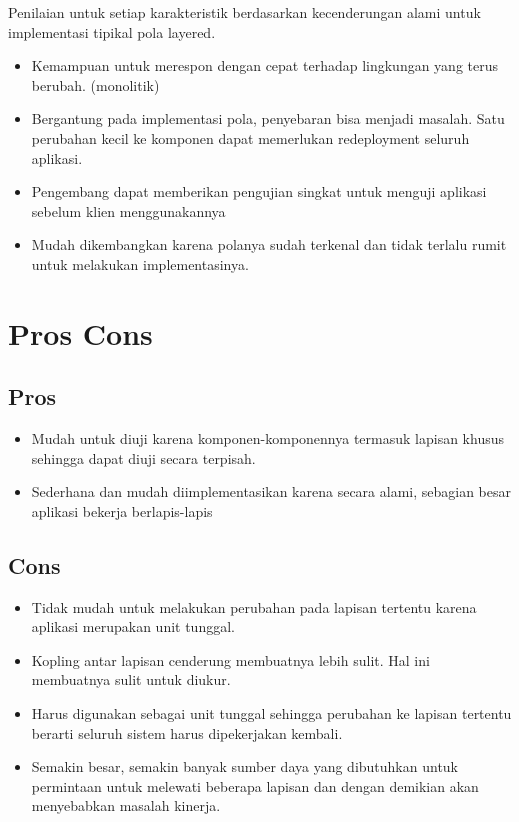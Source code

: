 Penilaian untuk setiap karakteristik berdasarkan kecenderungan alami untuk implementasi tipikal pola layered.

\begin{itemize}
    \item Kemampuan untuk merespon dengan cepat terhadap lingkungan yang terus berubah. (monolitik)
    \item Bergantung pada implementasi pola, penyebaran bisa menjadi masalah. Satu perubahan kecil ke komponen dapat memerlukan redeployment seluruh aplikasi.
    \item Pengembang dapat memberikan pengujian singkat untuk menguji aplikasi sebelum klien menggunakannya
    \item Mudah dikembangkan karena polanya sudah terkenal dan tidak terlalu rumit untuk melakukan implementasinya.
\end{itemize}

\section{Pros Cons}

\subsection{Pros}

\begin{itemize}
    \item Mudah untuk diuji karena komponen-komponennya termasuk lapisan khusus sehingga dapat diuji secara terpisah.
    \item Sederhana dan mudah diimplementasikan karena secara alami, sebagian besar aplikasi bekerja berlapis-lapis
\end{itemize}

\subsection{Cons}

\begin{itemize}
    \item Tidak mudah untuk melakukan perubahan pada lapisan tertentu karena aplikasi merupakan unit tunggal.
    \item Kopling antar lapisan cenderung membuatnya lebih sulit. Hal ini membuatnya sulit untuk diukur.
    \item Harus digunakan sebagai unit tunggal sehingga perubahan ke lapisan tertentu berarti seluruh sistem harus dipekerjakan kembali.
    \item Semakin besar, semakin banyak sumber daya yang dibutuhkan untuk permintaan untuk melewati beberapa lapisan dan dengan demikian akan menyebabkan masalah kinerja.
\end{itemize}

